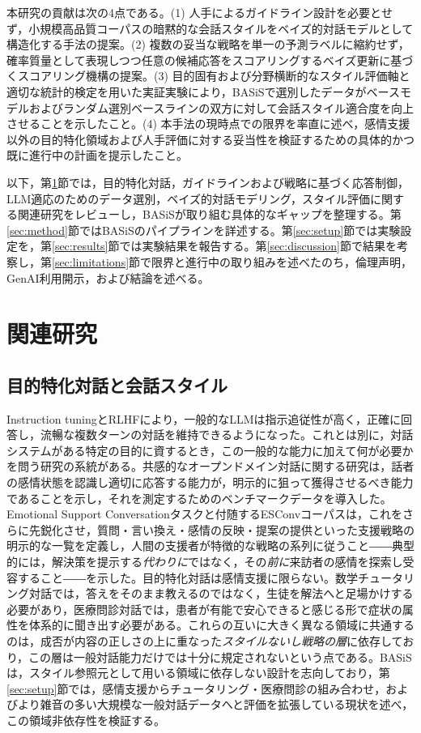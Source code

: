 \documentclass[manuscript,review,anonymous]{acmart}
\begin{document}
本研究の貢献は次の4点である。(1) 人手によるガイドライン設計を必要とせず，小規模高品質コーパスの暗黙的な会話スタイルをベイズ的対話モデルとして構造化する手法の提案。(2) 複数の妥当な戦略を単一の予測ラベルに縮約せず，確率質量として表現しつつ任意の候補応答をスコアリングするベイズ更新に基づくスコアリング機構の提案。(3) 目的固有および分野横断的なスタイル評価軸と適切な統計的検定を用いた実証実験により，BASiSで選別したデータがベースモデルおよびランダム選別ベースラインの双方に対して会話スタイル適合度を向上させることを示したこと。(4) 本手法の現時点での限界を率直に述べ，感情支援以外の目的特化領域および人手評価に対する妥当性を検証するための具体的かつ既に進行中の計画を提示したこと。

以下，第\ref{sec:relwork}節では，目的特化対話，ガイドラインおよび戦略に基づく応答制御，LLM適応のためのデータ選別，ベイズ的対話モデリング，スタイル評価に関する関連研究をレビューし，BASiSが取り組む具体的なギャップを整理する。第\ref{sec:method}節ではBASiSのパイプラインを詳述する。第\ref{sec:setup}節では実験設定を，第\ref{sec:results}節では実験結果を報告する。第\ref{sec:discussion}節で結果を考察し，第\ref{sec:limitations}節で限界と進行中の取り組みを述べたのち，倫理声明，GenAI利用開示，および結論を述べる。


\section{関連研究}
\label{sec:relwork}

\subsection{目的特化対話と会話スタイル}
Instruction tuningとRLHFにより，一般的なLLMは指示追従性が高く，正確に回答し，流暢な複数ターンの対話を維持できるようになった\cite{ouyang2022instructgpt}。これとは別に，対話システムがある特定の目的に資するとき，この一般的な能力に加えて何が必要かを問う研究の系統がある。共感的なオープンドメイン対話に関する研究は，話者の感情状態を認識し適切に応答する能力が，明示的に狙って獲得させるべき能力であることを示し，それを測定するためのベンチマークデータを導入した\cite{rashkin2019empathetic}。Emotional Support Conversationタスクと付随するESConvコーパス\cite{liu2021esconv}は，これをさらに先鋭化させ，質問・言い換え・感情の反映・提案の提供といった支援戦略の明示的な一覧を定義し，人間の支援者が特徴的な戦略の系列に従うこと――典型的には，解決策を提示する\emph{代わりに}ではなく，その\emph{前に}来訪者の感情を探索し受容すること――を示した。目的特化対話は感情支援に限らない。数学チュータリング対話では，答えをそのまま教えるのではなく，生徒を解法へと足場かけする必要があり\cite{macina2023mathdial}，医療問診対話では，患者が有能で安心できると感じる形で症状の属性を体系的に聞き出す必要がある\cite{saley2024meditod}。これらの互いに大きく異なる領域に共通するのは，成否が内容の正しさの上に重なった\emph{スタイルないし戦略の層}に依存しており，この層は一般対話能力だけでは十分に規定されないという点である。BASiSは，スタイル参照元として用いる領域に依存しない設計を志向しており，第\ref{sec:setup}節では，感情支援からチュータリング・医療問診の組み合わせ，およびより雑音の多い大規模な一般対話データへと評価を拡張している現状を述べ，この領域非依存性を検証する。
\end{document}
